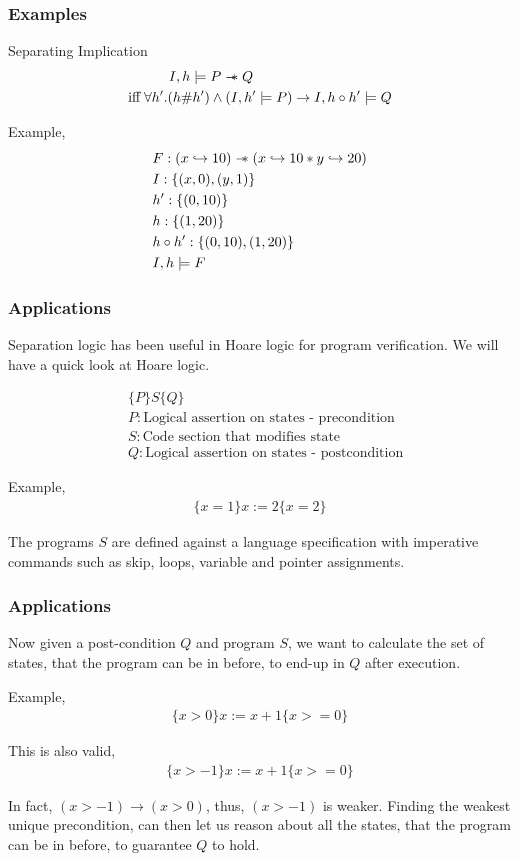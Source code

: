 \documentclass{beamer}
\newcommand\sepimp{\mathrel{-\mkern-6mu*}}
\begin{document}
\begin{frame}
\frametitle{Examples}
Separating Implication
\begin{align*}
    I,h \models P \sepimp Q \hspace{3.5cm} \\ 
    \textrm{iff} \; \forall h'.(h \# h') \land (I,h' \models P) \to I,h \circ h' \models Q
\end{align*}

Example,
\begin{align*}
    & F : (x \hookrightarrow 10) \sepimp (x \hookrightarrow 10 * y \hookrightarrow 20) \\
    & I : \{(x,0), (y,1)\} \\
    & h' : \{(0,10)\} \\
    & h : \{(1,20) \} \\
    & h \circ h' : \{(0,10), (1,20)\} \\
    & I,h \models F
\end{align*}
\end{frame}

\begin{frame}
\frametitle{Applications}
Separation logic has been useful in Hoare logic for program verification. We will
have a quick look at Hoare logic.

\begin{align*}
    & \{P\}S\{Q\} \\
    & P : \textrm{Logical assertion on states - precondition} \\
    & S : \textrm{Code section that modifies state} \\
    & Q : \textrm{Logical assertion on states - postcondition}
\end{align*}

Example,
\begin{align*}
    \{x = 1\}x := 2\{x = 2\}
\end{align*}

The programs $S$ are defined against a language specification with 
imperative commands such as skip, loops,
variable and pointer assignments.
\end{frame}

\begin{frame}
\frametitle{Applications}
Now given a post-condition $Q$ and program $S$, we want to calculate the set
of states, that the program can be in before, to end-up in $Q$ after execution.

Example,
\begin{align*}
    \{x > 0\}x := x + 1\{x >= 0\}
\end{align*}

This is also valid,
\begin{align*}
    \{x > -1\}x := x + 1\{x >= 0\}
\end{align*}

In fact, $(x > -1) \to (x > 0)$, thus, $(x > -1)$ is weaker. Finding the
weakest unique precondition, can then let us reason about all the states,
that the program can be in before, to guarantee $Q$ to hold.
\end{frame}
\end{document}
